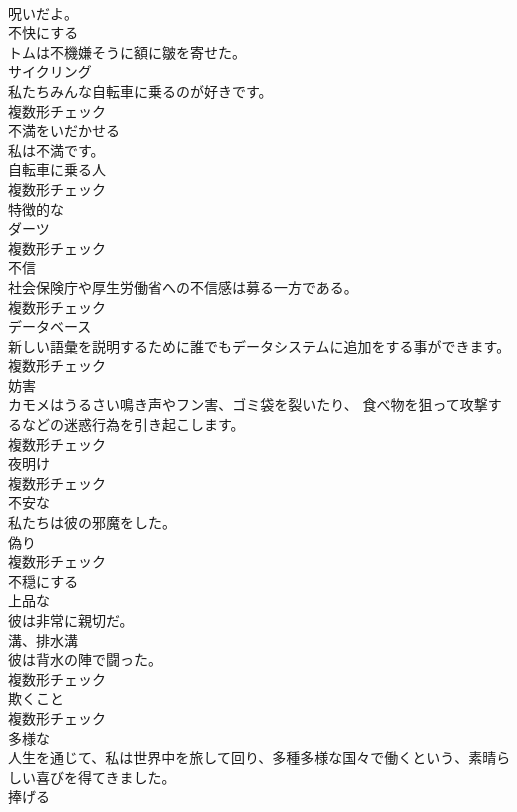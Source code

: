 \documentclass[8pt]{extreport}
\begin{document}
\begin{CJK}{UTF8}{min}
\\	呪いだよ。	
\\	[動詞]	不快にする	
\\	トムは不機嫌そうに額に皺を寄せた。	
\\	[名詞]	サイクリング	
\\	私たちみんな自転車に乗るのが好きです。	
\\	複数形チェック
\\	[動詞]	不満をいだかせる	
\\	私は不満です。	
\\	[名詞]	自転車に乗る人	
\\	複数形チェック
\\	[形容詞]	特徴的な	
\\	[名詞]	ダーツ	
\\	複数形チェック
\\	[名詞]	不信	
\\	社会保険庁や厚生労働省への不信感は募る一方である。	
\\	複数形チェック
\\	[名詞]	データベース	
\\	新しい語彙を説明するために誰でもデータシステムに追加をする事ができます。	
\\	複数形チェック
\\	[名詞]	妨害	
\\	カモメはうるさい鳴き声やフン害、ゴミ袋を裂いたり、 食べ物を狙って攻撃するなどの迷惑行為を引き起こします。	
\\	複数形チェック
\\	[名詞]	夜明け	
\\	複数形チェック
\\	[形容詞]	不安な	
\\	私たちは彼の邪魔をした。	
\\	[名詞]	偽り	
\\	複数形チェック
\\	[形容詞]	不穏にする	
\\	[形容詞]	上品な	
\\	彼は非常に親切だ。	
\\	[名詞]	溝、排水溝	
\\	彼は背水の陣で闘った。	
\\	複数形チェック
\\	[名詞]	欺くこと	
\\	複数形チェック
\\	[形容詞]	多様な	
\\	人生を通じて、私は世界中を旅して回り、多種多様な国々で働くという、素晴らしい喜びを得てきました。	
\\	[動詞]	捧げる	

\end{CJK}
\end{document}
